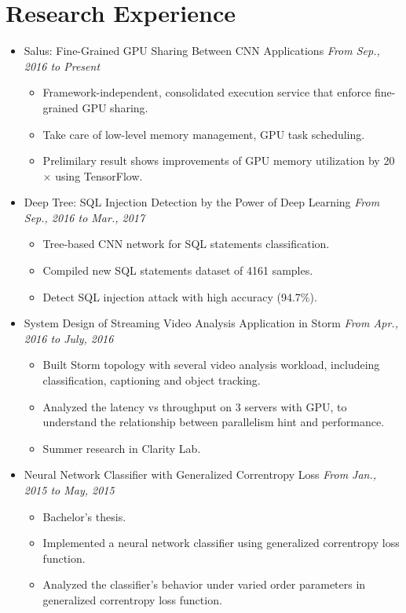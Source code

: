 \documentclass[a4paper,11pt]{article}
\begin{document}
\section{Research Experience}
\begin{itemize}
    \item Salus: Fine-Grained GPU Sharing Between CNN Applications \hfill \textit{From Sep., 2016 to Present}
    \begin{itemize}
        \item Framework-independent, consolidated execution service that enforce fine-grained GPU sharing.
        \item Take care of low-level memory management, GPU task scheduling.
        \item Prelimilary result shows improvements of GPU memory utilization by 20$\times$ using TensorFlow.
    \end{itemize}

    \item Deep Tree: SQL Injection Detection by the Power of Deep Learning \hfill \textit{From Sep., 2016 to Mar., 2017}
    \begin{itemize}
        \item Tree-based CNN network for SQL statements classification.
        \item Compiled new SQL statements dataset of 4161 samples.
        \item Detect SQL injection attack with high accuracy (94.7\%).
    \end{itemize}

    \item System Design of Streaming Video Analysis Application in Storm \hfill \textit{From Apr., 2016 to July, 2016}
    \begin{itemize}
        \item Built Storm topology with several video analysis workload, includeing classification, 
captioning and object tracking.
        \item Analyzed the latency vs throughput on 3 servers with GPU, to understand the relationship 
between parallelism hint and performance.
        \item Summer research in Clarity Lab.
    \end{itemize}

    \item Neural Network Classifier with Generalized Correntropy Loss \hfill \textit{From Jan., 2015 to
May, 2015}
    \begin{itemize}
        \item Bachelor's thesis.
        \item Implemented a neural network classifier using generalized correntropy loss function.
        \item Analyzed the classifier's behavior under varied order parameters in generalized correntropy loss
function.
    \end{itemize}
\end{itemize}
\end{document}
